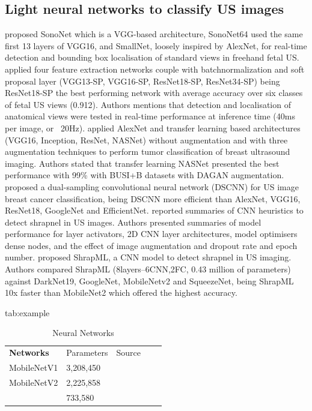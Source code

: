 \documentclass[mlabstract,twocolumn]{jmlr}
\begin{document}
\subsection{Light neural networks to classify US images}
\citet{baumgartner2017-IEEETransMedImag} proposed SonoNet which is a VGG-based architecture, SonoNet64 used the same first 13 layers of VGG16,
and SmallNet, loosely inspired by AlexNet, for real-time detection and bounding box localisation of standard views in freehand fetal US.
\citet{toussaint2018-MICCAI}
applied four feature extraction networks couple with batchnormalization and soft proposal layer (VGG13-SP, VGG16-SP, ResNet18-SP, ResNet34-SP) being ResNet18-SP the best performing network with average accuracy over six classes of fetal US views (0.912).
Authors mentions that detection and localisation of anatomical views were tested in real-time performance at inference time (40ms per image, or ~20Hz).
\citet{Al-Dhabyani2019-IJACSA} applied AlexNet and transfer learning based architectures (VGG16, Inception, ResNet, NASNet) without augmentation and with three augmentation techniques to perform tumor classification of breast ultrasound imaging. Authors stated that transfer learning NASNet presented the best performance with 99\% with BUSI+B datasets with DAGAN augmentation.
\citet{xie2020-physics-in-medicine-biology} proposed a dual-sampling convolutional neural network (DSCNN) for US image breast cancer classification, being DSCNN more efficient than AlexNet, VGG16, ResNet18, GoogleNet and EfficientNet.
\citet{snider2022-ScientificReports} reported summaries of CNN heuristics to detect shrapnel in US images.
Authors presented summaries of model performance for layer activators, 2D CNN layer architectures, model optimisers dense nodes, and the effect of image augmentation and dropout rate and epoch number.
\citet{boice2022-in-jimaging} proposed ShrapML, a CNN model to detect shrapnel in US imaging.
Authors compared ShrapML (8layers--6CNN,2FC, 0.43 million of parameters) against DarkNet19, GoogleNet, MobileNetv2 and SqueezeNet, being ShrapML 10x faster than MobileNet2 which offered the highest accuracy.

\begin{table}[htbp]
\floatconts
  {tab:example}%
  {\caption{Neural Networks}}%
{\begin{tabular}{lllll}
\textbf{Networks} & Parameters & Source \\
MobileNetV1 & 3,208,450 &   \\ 
MobileNetV2 & 2,225,858 &    \\
\citet{iandola2017squeezenet} & 733,580 &    
\end{tabular}}
\end{table}
\end{document}
